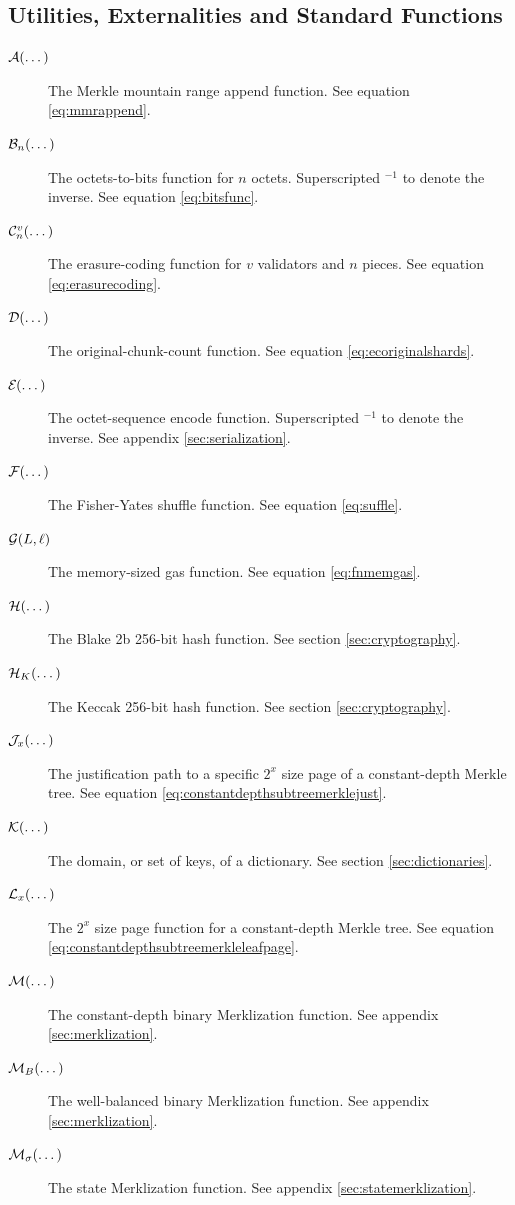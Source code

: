 \subsection{Utilities, Externalities and Standard Functions}

\begin{description}
  \item[$\mathcal{A}(\dots)$] The Merkle mountain range append function. See equation \ref{eq:mmrappend}.
  \item[$\mathcal{B}_{n}(\dots)$] The octets-to-bits function for $n$ octets. Superscripted ${}^{-1}$ to denote the inverse. See equation \ref{eq:bitsfunc}.
  \item[$\erasurecode{v}{n}{\dots}$] The erasure-coding function for $v$ validators and $n$ pieces. See equation \ref{eq:erasurecoding}.
  \item[$\mathcal{D}(\dots)$] The original-chunk-count function. See equation \ref{eq:ecoriginalshards}.
  \item[$\encode{\dots}$] The octet-sequence encode function. Superscripted ${}^{-1}$ to denote the inverse. See appendix \ref{sec:serialization}.
  \item[$\mathcal{F}(\dots)$] The Fisher-Yates shuffle function. See equation \ref{eq:suffle}.
  \item[$\mathcal{G}(L, \ell)$] The memory-sized gas function. See equation \ref{eq:fnmemgas}.
  \item[$\blake{\dots}$] The Blake 2b 256-bit hash function. See section \ref{sec:cryptography}.
  \item[$\keccak{\dots}$] The Keccak 256-bit hash function. See section \ref{sec:cryptography}.

  \item[$\mathcal{J}_{x}(\dots)$] The justification path to a specific $2^x$ size page of a constant-depth Merkle tree. See equation \ref{eq:constantdepthsubtreemerklejust}.
  \item[$\keys{\dots}$] The domain, or set of keys, of a dictionary. See section \ref{sec:dictionaries}.
  \item[$\mathcal{L}_{x}(\dots)$] The $2^x$ size page function for a constant-depth Merkle tree. See equation \ref{eq:constantdepthsubtreemerkleleafpage}.
  \item[$\merklizecd{\dots}$] The constant-depth binary Merklization function. See appendix \ref{sec:merklization}.
  \item[$\merklizewb{\dots}$] The well-balanced binary Merklization function. See appendix \ref{sec:merklization}.
  \item[$\merklizestate{\dots}$] The state Merklization function. See appendix \ref{sec:statemerklization}.


\end{description}

